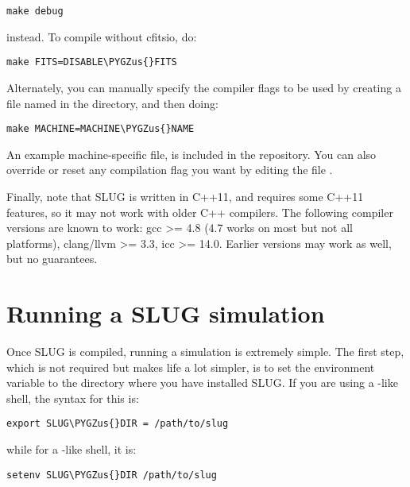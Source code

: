 \documentclass[letterpaper,10pt,english]{sphinxmanual}
\def\PYGZus{\char`\_}
\begin{document}
\begin{Verbatim}[commandchars=\\\{\}]
make debug
\end{Verbatim}

instead. To compile without cfitsio, do:

\begin{Verbatim}[commandchars=\\\{\}]
make FITS=DISABLE\PYGZus{}FITS
\end{Verbatim}

Alternately, you can manually specify the compiler flags to be used by creating a file named  in the  directory, and then doing:

\begin{Verbatim}[commandchars=\\\{\}]
make MACHINE=MACHINE\PYGZus{}NAME
\end{Verbatim}

An example machine-specific file,  is included in the repository. You can also override or reset any compilation flag you want by editing the file .

Finally, note that SLUG is written in C++11, and requires some C++11 features, so it may not work with older C++ compilers. The following compiler versions are known to work: gcc \textgreater{}= 4.8 (4.7 works on most but not all platforms), clang/llvm \textgreater{}= 3.3, icc \textgreater{}= 14.0. Earlier versions may work as well, but no guarantees.


\chapter{Running a SLUG simulation}
\label{running::doc}\label{running:running-a-slug-simulation}
Once SLUG is compiled, running a simulation is extremely simple. The first step, which is not required but makes life a lot simpler, is to set the environment variable  to the directory where you have installed SLUG. If you are using a -like shell, the syntax for this is:

\begin{Verbatim}[commandchars=\\\{\}]
export SLUG\PYGZus{}DIR = /path/to/slug
\end{Verbatim}

while for a -like shell, it is:

\begin{Verbatim}[commandchars=\\\{\}]
setenv SLUG\PYGZus{}DIR /path/to/slug
\end{Verbatim}
\end{document}
